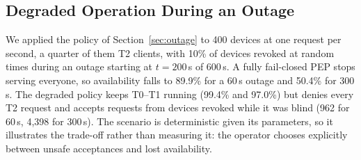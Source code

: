 \subsection{Degraded Operation During an Outage}\label{sec:outage_eval}
We applied the policy of Section~\ref{sec:outage} to 400 devices at one request per second, a quarter of them T2 clients, with 10\% of devices revoked at random times during an outage starting at $t=200$\,s of 600\,s. A fully fail-closed PEP stops serving everyone, so availability falls to 89.9\% for a 60\,s outage and 50.4\% for 300\,s. The degraded policy keeps T0--T1 running (99.4\% and 97.0\%) but denies every T2 request and accepts requests from devices revoked while it was blind (962 for 60\,s, 4{,}398 for 300\,s). The scenario is deterministic given its parameters, so it illustrates the trade-off rather than measuring it: the operator chooses explicitly between unsafe acceptances and lost availability.
